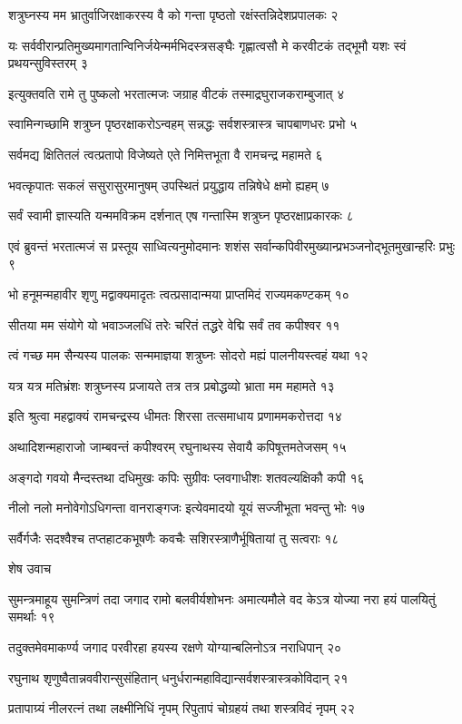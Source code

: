 शत्रुघ्नस्य मम भ्रातुर्वाजिरक्षाकरस्य वै
को गन्ता पृष्ठतो रक्षंस्तन्निदेशप्रपालकः २

यः सर्ववीरान्प्रतिमुख्यमागतान्विनिर्जयेन्मर्मभिदस्त्रसङ्घैः
गृह्णात्वसौ मे करवीटकं तद्भूमौ यशः स्वं प्रथयन्सुविस्तरम् ३

इत्युक्तवति रामे तु पुष्कलो भरतात्मजः
जग्राह वीटकं तस्माद्रघुराजकराम्बुजात् ४

स्वामिन्गच्छामि शत्रुघ्न पृष्ठरक्षाकरोऽन्वहम्
सन्नद्धः सर्वशस्त्रास्त्र चापबाणधरः प्रभो ५

सर्वमद्य क्षितितलं त्वत्प्रतापो विजेष्यते
एते निमित्तभूता वै रामचन्द्र महामते ६

भवत्कृपातः सकलं ससुरासुरमानुषम्
उपस्थितं प्रयुद्धाय तन्निषेधे क्षमो ह्यहम् ७

सर्वं स्वामी ज्ञास्यति यन्ममविक्रम दर्शनात्
एष गन्तास्मि शत्रुघ्न पृष्ठरक्षाप्रकारकः ८

एवं ब्रुवन्तं भरतात्मजं स प्रस्तूय साध्वित्यनुमोदमानः
शशंस सर्वान्कपिवीरमुख्यान्प्रभञ्जनोद्भूतमुखान्हरिः प्रभुः ९

भो हनूमन्महावीर शृणु मद्वाक्यमादृतः
त्वत्प्रसादान्मया प्राप्तमिदं राज्यमकण्टकम् १०

सीतया मम संयोगे यो भवाञ्जलधिं तरेः
चरितं तद्धरे वेद्मि सर्वं तव कपीश्वर ११

त्वं गच्छ मम सैन्यस्य पालकः सन्ममाज्ञया
शत्रुघ्नः सोदरो मह्यं पालनीयस्त्वहं यथा १२

यत्र यत्र मतिभ्रंशः शत्रुघ्नस्य प्रजायते
तत्र तत्र प्रबोद्धव्यो भ्राता मम महामते १३

इति श्रुत्वा महद्वाक्यं रामचन्द्रस्य धीमतः
शिरसा तत्समाधाय प्रणाममकरोत्तदा १४

अथादिशन्महाराजो जाम्बवन्तं कपीश्वरम्
रघुनाथस्य सेवायै कपिषूत्तमतेजसम् १५

अङ्गदो गवयो मैन्दस्तथा दधिमुखः कपिः
सुग्रीवः प्लवगाधीशः शतवल्यक्षिकौ कपी १६

नीलो नलो मनोवेगोऽधिगन्ता वानराङ्गजः
इत्येवमादयो यूयं सज्जीभूता भवन्तु भोः १७

सर्वैर्गजैः सदश्वैश्च तप्तहाटकभूषणैः
कवचैः सशिरस्त्राणैर्भूषितायां तु सत्वराः १८

शेष उवाच

सुमन्त्रमाहूय सुमन्त्रिणं तदा जगाद रामो बलवीर्यशोभनः
अमात्यमौले वद केऽत्र योज्या नरा हयं पालयितुं समर्थाः १९

तदुक्तमेवमाकर्ण्य जगाद परवीरहा
हयस्य रक्षणे योग्यान्बलिनोऽत्र नराधिपान् २०

रघुनाथ शृणुष्वैतान्नववीरान्सुसंहितान्
धनुर्धरान्महाविद्यान्सर्वशस्त्रास्त्रकोविदान् २१

प्रतापाग्र्यं नीलरत्नं तथा लक्ष्मीनिधिं नृपम्
रिपुतापं चोग्रहयं तथा शस्त्रविदं नृपम् २२

